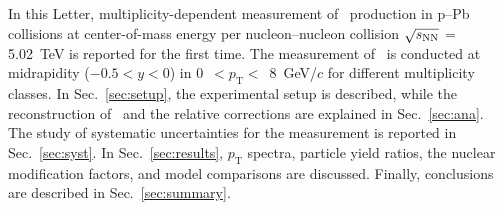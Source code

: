 In this Letter, multiplicity-dependent measurement of \fzero~production in p--Pb collisions at center-of-mass energy per nucleon--nucleon collision $\sqrt{s_{\rm NN}}$ = 5.02~TeV is reported for the first time. The measurement of \fzero~is conducted at midrapidity ($-0.5<y<0$) in 0~$<p_{\mathrm{T}}<$~8~GeV/$c$ for different multiplicity classes. In Sec.~\ref{sec:setup}, the experimental setup is described, while the reconstruction of \fzero\ and the relative corrections are explained in Sec.~\ref{sec:ana}. The study of systematic uncertainties for the measurement is reported in Sec.~\ref{sec:syst}. In Sec.~\ref{sec:results}, $p_{\mathrm{T}}$ spectra, particle yield ratios, the nuclear modification factors, and model comparisons are discussed. Finally, conclusions are described in Sec.~\ref{sec:summary}.


\label{sec:intro}



